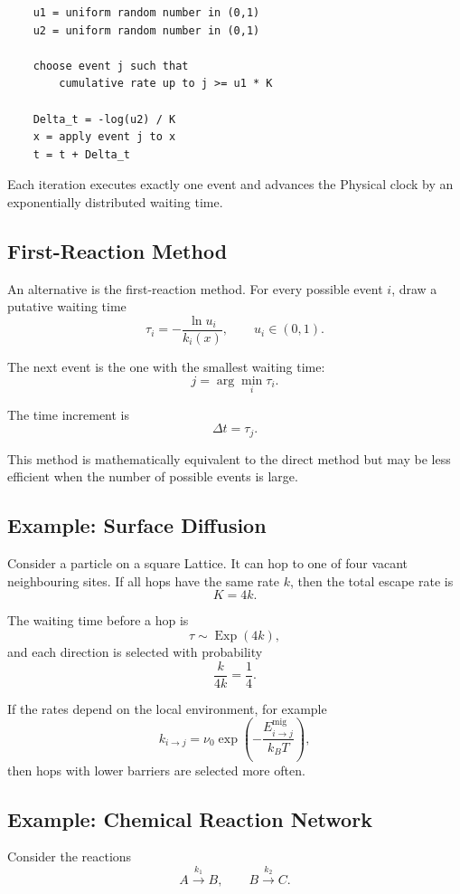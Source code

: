 \documentclass[a4paper, 10pt, onepage]{elegantbook}
\begin{document}
{\begin{verbatim}
    u1 = uniform random number in (0,1)
    u2 = uniform random number in (0,1)

    choose event j such that
        cumulative rate up to j >= u1 * K

    Delta_t = -log(u2) / K
    x = apply event j to x
    t = t + Delta_t
\end{verbatim}

Each iteration executes exactly one event and advances the Physical clock by an
exponentially distributed waiting time.

\subsection{First-Reaction Method}

An alternative is the first-reaction method. For every possible event \(i\),
draw a putative waiting time
\[
\tau_i
=
-\frac{\ln u_i}{k_i(x)},
\qquad
u_i\in(0,1).
\]

The next event is the one with the smallest waiting time:
\[
j=\arg\min_i\tau_i.
\]

The time increment is
\[
\Delta t=\tau_j.
\]

This method is mathematically equivalent to the direct method but may be less
efficient when the number of possible events is large.

\subsection{Example: Surface Diffusion}

Consider a particle on a square Lattice. It can hop to one of four vacant
neighbouring sites. If all hops have the same rate \(k\), then the total escape
rate is
\[
K=4k.
\]

The waiting time before a hop is
\[
\tau\sim\operatorname{Exp}(4k),
\]
and each direction is selected with probability
\[
\frac{k}{4k}=\frac14.
\]

If the rates depend on the local environment, for example
\[
k_{i\to j}
=
\nu_0
\exp\left(
-\frac{E_{i\to j}^{\mathrm{mig}}}{k_BT}
\right),
\]
then hops with lower barriers are selected more often.

\subsection{Example: Chemical Reaction Network}

Consider the reactions
\[
A\xrightarrow{k_1}B,
\qquad
B\xrightarrow{k_2}C.
\]

}
\end{document}
